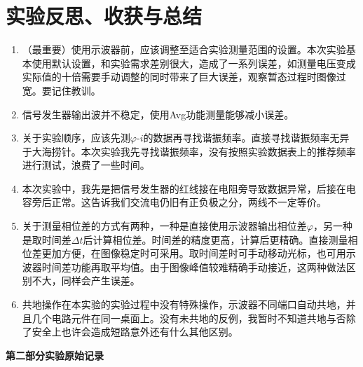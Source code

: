 \documentclass[UTF8]{article}
\begin{document}
\section{实验反思、收获与总结}
\begin{enumerate}
    \item （最重要）使用示波器前，应该调整至适合实验测量范围的设置。本次实验基本使用默认设置，和实验需求差别很大，造成了一系列误差，如测量电压变成实际值的十倍需要手动调整的同时带来了巨大误差，观察暂态过程时图像过宽。要记住教训。
    \item 信号发生器输出波并不稳定，使用Avg功能测量能够减小误差。
    \item 关于实验顺序，应该先测$\varphi\text{-}i$的数据再寻找谐振频率。直接寻找谐振频率无异于大海捞针。本次实验我先寻找谐振频率，没有按照实验数据表上的推荐频率进行测试，浪费了一些时间。
    \item 本次实验中，我先是把信号发生器的红线接在电阻旁导致数据异常，后接在电容旁后正常。这告诉我们交流电仍旧有正负极之分，两线不一定等价。
    \item 关于测量相位差的方式有两种，一种是直接使用示波器输出相位差$\varphi$，另一种是取时间差$\Delta t$后计算相位差。时间差的精度更高，计算后更精确。直接测量相位差更加方便，在图像稳定时可采用。取时间差时可手动移动光标，也可用示波器时间差功能再取平均值。由于图像峰值较难精确手动接近，这两种做法区别不大，同样会产生误差。
    \item 共地操作在本实验的实验过程中没有特殊操作，示波器不同端口自动共地，并且几个电路元件在同一桌面上。没有未共地的反例，我暂时不知道共地与否除了安全上也许会造成短路意外还有什么其他区别。

\end{enumerate}

\bigskip
\begin{center}
    \vspace*{1em}
    \Large \bf 第二部分\qquad 实验原始记录
\end{center}

\end{document}
